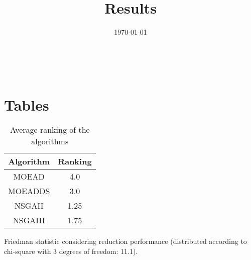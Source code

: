 \documentclass{article}
\title{Results}
\author{}
\date{\today}
\begin{document}
\oddsidemargin 0in \topmargin 0in\maketitle
\
\section{Tables}
\begin{table}[!htp]
\centering
\caption{Average ranking of the algorithms}
\begin{tabular}{c|c}
Algorithm&Ranking\\
\hline
MOEAD&4.0\\
MOEADDS&3.0\\
NSGAII&1.25\\
NSGAIII&1.75\\
\end{tabular}
\end{table}


Friedman statistic considering reduction performance (distributed according to chi-square with 3 degrees of freedom: 11.1).
\end{document}
